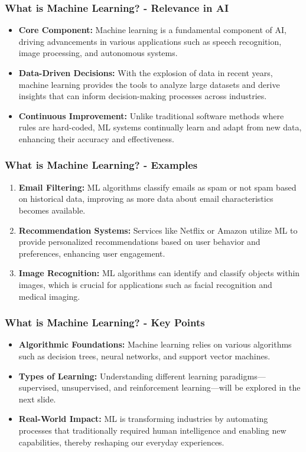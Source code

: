 \documentclass[aspectratio=169]{beamer}
\begin{document}
\begin{frame}[fragile]
    \frametitle{What is Machine Learning? - Relevance in AI}
    \begin{itemize}
        \item \textbf{Core Component:} 
            Machine learning is a fundamental component of AI, driving advancements in various applications such as speech recognition, image processing, and autonomous systems.
        \item \textbf{Data-Driven Decisions:} 
            With the explosion of data in recent years, machine learning provides the tools to analyze large datasets and derive insights that can inform decision-making processes across industries.
        \item \textbf{Continuous Improvement:} 
            Unlike traditional software methods where rules are hard-coded, ML systems continually learn and adapt from new data, enhancing their accuracy and effectiveness.
    \end{itemize}
\end{frame}

\begin{frame}[fragile]
    \frametitle{What is Machine Learning? - Examples}
    \begin{enumerate}
        \item \textbf{Email Filtering:} 
            ML algorithms classify emails as spam or not spam based on historical data, improving as more data about email characteristics becomes available.
        \item \textbf{Recommendation Systems:} 
            Services like Netflix or Amazon utilize ML to provide personalized recommendations based on user behavior and preferences, enhancing user engagement.
        \item \textbf{Image Recognition:} 
            ML algorithms can identify and classify objects within images, which is crucial for applications such as facial recognition and medical imaging.
    \end{enumerate}
\end{frame}

\begin{frame}[fragile]
    \frametitle{What is Machine Learning? - Key Points}
    \begin{itemize}
        \item \textbf{Algorithmic Foundations:} 
            Machine learning relies on various algorithms such as decision trees, neural networks, and support vector machines.
        \item \textbf{Types of Learning:} 
            Understanding different learning paradigms—supervised, unsupervised, and reinforcement learning—will be explored in the next slide.
        \item \textbf{Real-World Impact:} 
            ML is transforming industries by automating processes that traditionally required human intelligence and enabling new capabilities, thereby reshaping our everyday experiences.
    \end{itemize}
\end{frame}
\end{document}
